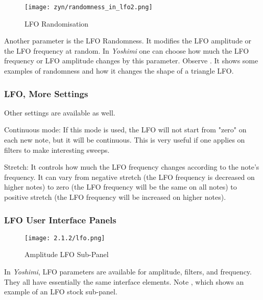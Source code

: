 \begin{figure}[H]
   \centering
   \texttt{[image: zyn/randomness\_in\_lfo2.png]}
   \caption[LFO Randomisation]{LFO Randomisation}
   \label{fig:randomness_in_lfo}
\end{figure}

   Another parameter is the LFO Randomness. It modifies the LFO amplitude or
   the LFO frequency at random. In \textsl{Yoshimi}
   one can choose how much the LFO
   frequency or LFO amplitude changes by this parameter.
   Observe .
   It shows some examples of randomness and how it changes the shape of a
   triangle LFO.

\subsubsection{LFO, More Settings}
\label{subsubsec:lfo_more_settings}

   Other settings are available as well.

   Continuous mode: If this mode is used, the LFO will not start from "zero" on
   each new note, but it will be continuous. This is very useful if one
   applies on filters to make interesting sweeps.

   Stretch: It controls how much the LFO frequency changes according to the
   note’s frequency. It can vary from negative stretch (the LFO frequency is
   decreased on higher notes) to zero (the LFO frequency will be the same
   on all notes) to positive stretch (the LFO frequency will be
   increased on higher notes).

\subsubsection{LFO User Interface Panels}
\label{subsubsec:lfo_user_interface_panels}

   \setcounter{ItemCounter}{0}      %

\begin{figure}[H]
   \centering
   \texttt{[image: 2.1.2/lfo.png]}
   \caption[Amplitude LFO Sub-Panel]{Amplitude LFO Sub-Panel}
   \label{fig:amplitude_lfo}
\end{figure}

   In \textsl{Yoshimi}, LFO parameters are available for amplitude, filters,
   and frequency.  They all have essentially the same interface elements.
   Note , which
   shows an example of an LFO stock sub-panel.

